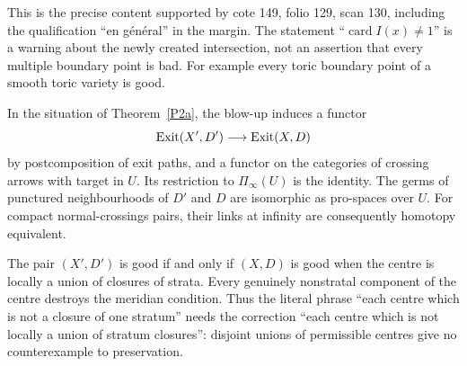 This is the precise content supported by cote 149, folio 129, scan 130,
including the qualification ``en g\'en\'eral'' in the margin.  The statement
``$\operatorname{card}I(x)\ne1$'' is a warning about the newly created
intersection, not an assertion that every multiple boundary point is bad.
For example every toric boundary point of a smooth toric variety is good.

\begin{theorem}\label{P2b}
In the situation of Theorem~\ref{P2a}, the blow-up induces a functor
\[
 \operatorname{Exit}(X',D')\longrightarrow\operatorname{Exit}(X,D)
\]
by postcomposition of exit paths, and a functor on the categories of crossing
arrows with target in $U$.  Its restriction to $\Pi_\infty(U)$ is the identity.
The germs of punctured neighbourhoods of $D'$ and $D$ are isomorphic as
pro-spaces over $U$.  For compact normal-crossings pairs, their links at infinity
are consequently homotopy equivalent.

The pair $(X',D')$ is good if and only if $(X,D)$ is good when the centre is
locally a union of closures of strata.  Every genuinely nonstratal component
of the centre destroys the meridian condition.  Thus the literal phrase
``each centre which is not a closure of one stratum'' needs the correction
``each centre which is not locally a union of stratum closures'': disjoint
unions of permissible centres give no counterexample to preservation.
\end{theorem}
